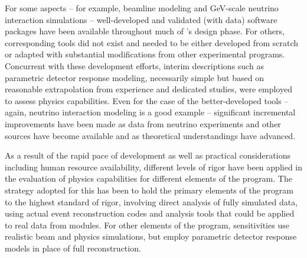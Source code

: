 For some aspects -- for example, beamline modeling
and GeV-scale neutrino interaction simulations --
well-developed and validated (with data) software packages have
been available throughout much of 's design phase.
For others, corresponding tools did not exist and needed to be
either developed from scratch or adapted with substantial
modifications from other experimental programs.  Concurrent
with these development efforts, interim descriptions such
as parametric detector response modeling, necessarily simple
but based on reasonable extrapolation from experience and
dedicated studies, were employed to assess physics capabilities.
Even for the case of the better-developed tools -- again, neutrino 
interaction modeling is a good example -- significant incremental
improvements have been made as data from neutrino experiments
and other sources have become available and as theoretical
understandings have advanced.

As a result of the rapid pace of development as well as 
practical considerations including human 
resource availability, different levels
of rigor have been applied in the evaluation of physics 
capabilities for different elements of the program.  
The strategy adopted for
this  has been to hold the primary elements of the program
to the highest standard of rigor, involving direct analysis
of fully simulated data, using actual event reconstruction
codes and analysis tools that could be applied to real data
from   modules.  For other elements of the
program, sensitivities use realistic beam and
physics simulations, but employ parametric detector
response models in place of full reconstruction.

